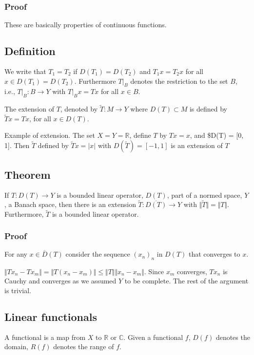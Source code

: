 \documentclass[11pt]{article}
\def\R{\mathbb{R}}
\def\C{\mathbb{C}}
\begin{document}
\subsubsection{Proof}
\label{sec:org8bb7e45}
These are basically properties of continuous functions.
\subsection{Definition}
\label{sec:org44f61ca}
We write that \(T_1 = T_2\) if \(D(T_1) = D(T_2)\) and \(T_1x = T_2x\) for all \(x
   \in D(T_1) = D(T_2)\). Furthermore \(T\vert_B\) denotes the restriction to the
set \(B\), i.e., \(T\vert_B \colon B \rightarrow Y\) with \(T\vert_B x = Tx\) for
all \(x \in B\).

The extension of \(T\), denoted by \(\tilde{T}\colon M \rightarrow Y\) where \(D(T)
   \subset M\) is defined by \(\tilde{T}x = Tx\), for all \(x\in D(T)\).

Example of extension. The set \(X = Y = \R\), define \(T\) by \(Tx=x\), and \$D(T) =
[0, 1]. Then \(\tilde{T}\) defined by \(\tilde{T}x = \vert x \vert\) with
\(D(\tilde{T}) = [-1, 1]\) is an extension of \(T\)
\subsection{Theorem}
\label{sec:orgf6d0ac5}
If \(T \colon D(T) \rightarrow Y\) is a bounded linear operator, \(D(T)\), part
of a normed space, \(Y\), a Banach space, then there is an extension
\(\tilde{T}\colon \overline{D(T)} \rightarrow Y\) with \(\Vert \tilde{T} \Vert =
   \Vert T \Vert\). Furthermore, \(\tilde{T}\) is a bounded linear operator.
\subsubsection{Proof}
\label{sec:org5eba59f}
For any \(x \in \overline{D}(T)\) consider the sequence \((x_n)_n\) in \(D(T)\) that
converges to \(x\).

\(\Vert Tx_n - Tx_m \Vert = \Vert T(x_n - x_m)\Vert \le \Vert T \Vert \Vert
    x_n - x_m\Vert\). Since \(x_m\) converges, \(Tx_n\) is Cauchy and converges as we
assumed \(Y\) to be complete. The rest of the argument is trivial.
\subsection{Linear functionals}
\label{sec:orga6be8a3}
A functional is a map from \(X\) to \(\R\) or \(\C\). Given a functional \(f\),
\(D(f)\) denotes the domain, \(R(f)\) denotes the range of \(f\). 
\end{document}
